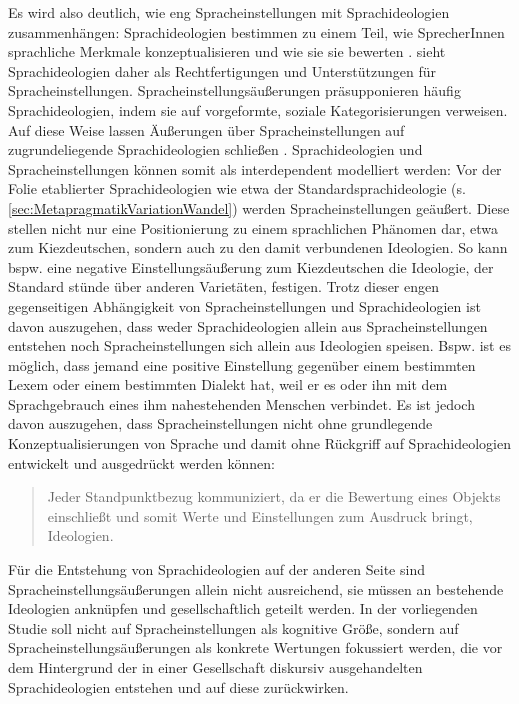 Es wird also deutlich, wie eng Sprach\-ein\-stel\-lungen mit Sprachideologien zusammenhängen: Sprachideologien bestimmen zu einem Teil, wie SprecherInnen sprachliche Merkmale konzeptualisieren und wie sie sie bewerten \citep[s.][206]{Maitz2015}. 
\citet[8]{Garrett.2012} sieht Sprachideologien daher als Rechtfertigungen und Unterst{\"u}tzungen f{\"u}r Spracheinstellungen. 
Spracheinstellungsäußerungen präsupponieren häufig Sprachideologien, indem sie auf \glqq vorgeformte, soziale Kategorisierungen\grqq{} \citep[][213]{Tophinke.2006} verweisen.
Auf diese Weise lassen Äußerungen über Spracheinstellungen auf zugrundeliegende Sprachideologien schließen \citep[s.][35]{Garrett.2012}.
Sprachideologien und Spracheinstellungen können somit als interdependent modelliert werden:
Vor der Folie etablierter Sprachideologien wie etwa der Standardsprachideologie (s. \autoref{sec:MetapragmatikVariationWandel}) werden Spracheinstellungen geäußert. 
Diese stellen nicht nur eine Positionierung zu einem sprachlichen Phänomen dar, etwa zum Kiezdeutschen, sondern auch zu den damit verbundenen Ideologien. 
So kann bspw. eine negative Einstellungsäußerung zum Kiezdeutschen die Ideologie, der Standard stünde über anderen Varietäten, festigen. 
Trotz dieser engen gegenseitigen Abhängigkeit von Spracheinstellungen und Sprachideologien ist davon auszugehen, dass weder Sprachideologien allein aus Spracheinstellungen entstehen noch Spracheinstellungen sich allein aus Ideologien speisen. 
Bspw. ist es möglich, dass jemand eine positive Einstellung gegenüber einem bestimmten Lexem oder einem bestimmten Dialekt hat, weil er es oder ihn mit dem Sprachgebrauch eines ihm nahestehenden Menschen verbindet. 
Es ist jedoch davon auszugehen, dass Spracheinstellungen nicht ohne grundlegende Konzeptualisierungen von Sprache und damit ohne Rückgriff auf Sprachideologien entwickelt und ausgedrückt werden können:
\begin{quote}Jeder Standpunktbezug kommuniziert, da er die Bewertung eines {\frq}Objekts{\flq} einschlie{\ss}t und somit Werte und Einstellungen zum Ausdruck bringt, Ideologien.~\citep[270]{Spitzmuller2013}\end{quote}
Für die Entstehung von Sprachideologien auf der anderen Seite sind Spracheinstellungsäußerungen allein nicht ausreichend, sie müssen an bestehende Ideologien anknüpfen und gesellschaftlich geteilt werden. 
In der vorliegenden Studie %
soll nicht auf Spracheinstellungen als kognitive Größe, sondern auf Spracheinstellungsäußerungen als konkrete Wertungen fokussiert werden, %
die vor dem Hintergrund der in einer Gesellschaft diskursiv ausgehandelten Sprachideologien entstehen und auf diese zurückwirken. 
